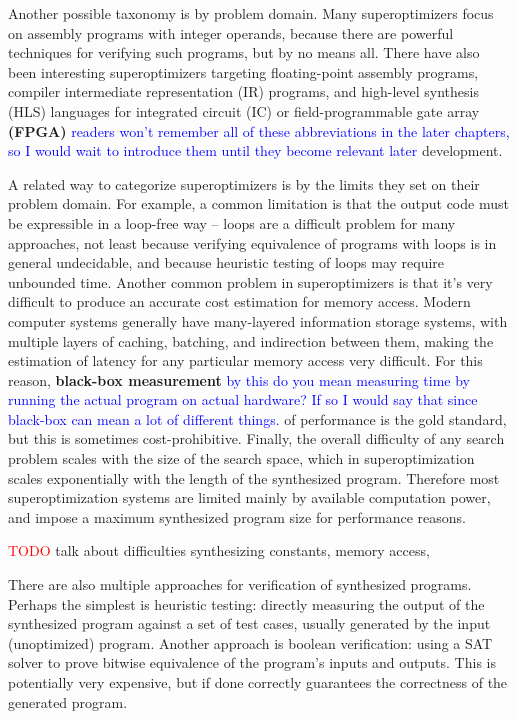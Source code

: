 \documentclass[12pt,twoside]{reedthesis}
\newcommand{\red}[1]{\textcolor{red}{#1}}
\newcommand{\comment}[2]{\textbf{#1} \textcolor{blue}{#2}}
\begin{document}
Another possible taxonomy is by problem domain.
Many superoptimizers focus on assembly programs with integer operands, because there are powerful techniques for verifying such programs, but by no means all.
There have also been interesting superoptimizers targeting 
    floating-point assembly programs, 
    compiler intermediate representation (IR) programs, 
    and high-level synthesis (HLS) languages for integrated circuit (IC) or field-programmable gate array \comment{(FPGA)}{readers won't remember all of these abbreviations in the later chapters, so I would wait to introduce them until they become relevant later} development.

A related way to categorize superoptimizers is by the limits they set on their problem domain.
For example, a common limitation is that the output code must be expressible in a loop-free way
    -- loops are a difficult problem for many approaches,
        not least because verifying equivalence of programs with loops is in general undecidable,
        and because heuristic testing of loops may require unbounded time.
Another common problem in superoptimizers is that it's very difficult to produce an accurate cost estimation for memory access.
    Modern computer systems generally have many-layered information storage systems, with multiple layers of caching, batching, and indirection between them, making the estimation of latency for any particular memory access very difficult.
    For this reason, \comment{black-box measurement}{by this do you mean measuring time by running the actual program on actual hardware? If so I would say that since black-box can mean a lot of different things.} of performance is the gold standard, but this is sometimes cost-prohibitive.
Finally, the overall difficulty of any search problem scales with the size of the search space, which in superoptimization scales exponentially with the length of the synthesized program.
    Therefore most superoptimization systems are limited mainly by available computation power, and impose a maximum synthesized program size for performance reasons.

\red{TODO} talk about difficulties synthesizing constants, memory access, %

There are also multiple approaches for verification of synthesized programs.
Perhaps the simplest is heuristic testing: 
    directly measuring the output of the synthesized program against a set of test cases, usually generated by the input (unoptimized) program.
Another approach is boolean verification: using a SAT solver to prove bitwise equivalence of the program's inputs and outputs.
This is potentially very expensive, but if done correctly guarantees the correctness of the generated program. 
\end{document}
